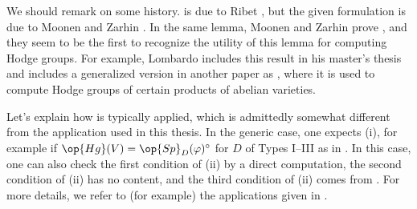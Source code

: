 \documentclass[../thesis.tex]{subfiles}
\begin{document}
\begin{remark}
	We should remark on some history.  is due to Ribet \cite[pp.~790--791]{ribet-galois-action-rm}, but the given formulation is due to Moonen and Zarhin \cite[Lemma~2.14]{moonen-zarhin-fourfold}. In the same lemma, Moonen and Zarhin prove , and they seem to be the first to recognize the utility of this lemma for computing Hodge groups. For example, Lombardo includes this result in his master's thesis \cite[Lemma~3.3.1]{lombardo-mumford-tate} and includes a generalized version in another paper as \cite[Lemma~3.7]{lombardo-ell-adic-product}, where it is used to compute Hodge groups of certain products of abelian varieties.
\end{remark}
\begin{remark}
	Let's explain how  is typically applied, which is admittedly somewhat different from the application used in this thesis. In the generic case, one expects (i), for example if $\op{Hg}(V)=\op{Sp}_D(\varphi)^\circ$ for $D$ of Types I--III as in . In this case, one can also check the first condition of (ii) by a direct computation, the second condition of (ii) has no content, and the third condition of (ii) comes from . For more details, we refer to (for example) the applications given in \cite{lombardo-mumford-tate,lombardo-ell-adic-product}.
\end{remark}
\end{document}
